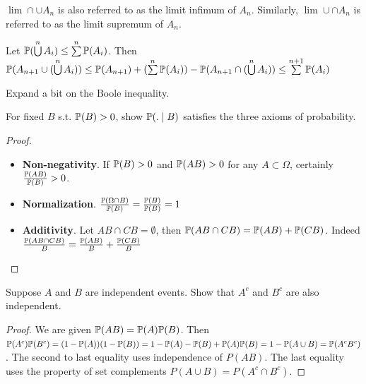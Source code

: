 \documentclass[10pt]{article}
\begin{document}
\begin{note}
    $\lim \cap \cup A_n$ is also referred to as the limit infimum of $A_n$. Similarly,
    $\lim \cup \cap A_n$ is referred to as the limit supremum of $A_n$.
\end{note}

\setcounter{exercise}{6}
\begin{exercise}
    Let $\P(\bigcup\limits^n A_i) \leq \sum\limits^n \P(A_i)$. Then
    $\P(A_{n+1} \cup (\bigcup\limits^n A_i)) \leq \P(A_{n+1}) +
    (\sum\limits^n \P(A_i)) - \P(A_{n+1} \cap(\bigcup\limits^n A_i)) \leq
    \sum\limits^{n+1}\P(A_i)$
\end{exercise}

\begin{note}
    Expand a bit on the Boole inequality.
\end{note}

\setcounter{exercise}{8}
\begin{exercise}
    For fixed $B$ s.t. $\P(B) > 0$, show $\P(.\mid B)$ satisfies the three
    axioms of probability.
\end{exercise}
\begin{proof}
    \begin{itemize}
        \item{\textbf{Non-negativity}. If $\P(B) > 0$ and $\P(AB) > 0$ for any
                $A \subset \Omega$, certainly
            $\frac{\P(AB)}{\P(B)} > 0$}.
        \item{\textbf{Normalization}. $\frac{\P(\Omega \cap B)}{\P(B)} =
            \frac{\P(B)}{\P(B)} = 1$}
        \item{\textbf{Additivity}. Let $AB \cap CB = \emptyset$, then $\P(AB
            \cap CB) = \P(AB) + \P(CB)$. Indeed $\frac{\P(AB\cap CB)}{B} =
        \frac{\P(AB)}{B} + \frac{\P(CB)}{B}$}
    \end{itemize}
\end{proof}

\setcounter{exercise}{10}
\begin{exercise}
    Suppose $A$ and $B$ are independent events. Show that $A^c$ and $B^c$ are
    also independent.
\end{exercise}
\begin{proof}
    We are given $\P(AB) = \P(A)\P(B)$. Then $\P(A^c)\P(B^c) = (1 - \P(A))(1
    - \P(B)) = 1 - \P(A) - \P(B) + \P(A)\P(B) = 1 - \P(A\cup B) = \P(A^cB^c)$.
    The second to last equality uses independence of $P(AB)$. The last equality
    uses the property of set complements $P(A \cup B) = P(A^c \cap B^c)$.
\end{proof}
\end{document}
